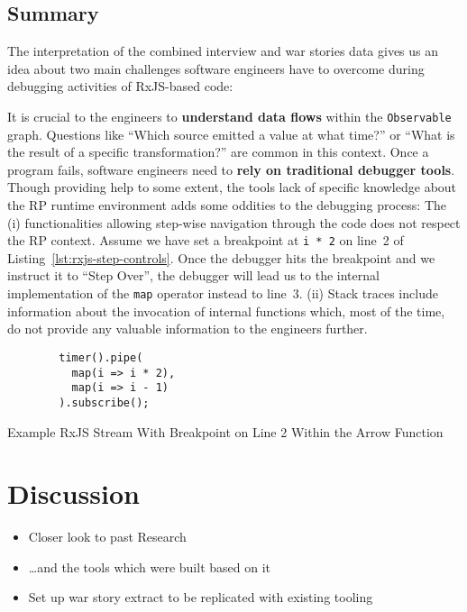 \documentclass[12pt,a4paper]{article}
\begin{document}
\subsection{Summary}

The interpretation of the combined interview and war stories data gives us an idea about two main challenges software engineers have to overcome during debugging activities of RxJS-based code:

It is crucial to the engineers to \textbf{understand data flows}  within the \texttt{Observable} graph. Questions like ``Which source emitted a value at what time?'' or ``What is the result of a specific transformation?'' are common in this context. Once a program fails, software engineers need to \textbf{rely on traditional debugger tools}. Though providing help to some extent, the tools lack of specific knowledge about the RP runtime environment adds some oddities to the debugging process: The (i) functionalities allowing step-wise navigation through the code does not respect the RP context. Assume we have set a breakpoint at \texttt{i * 2} on line~2 of Listing~\ref{lst:rxjs-step-controls}. Once the debugger hits the breakpoint and we instruct it to ``Step Over'', the debugger will lead us to the internal implementation of the \texttt{map} operator instead to line~3. (ii) Stack traces include information about the invocation of internal functions which, most of the time, do not provide any valuable information to the engineers further.

\begin{listing}[H]
	\begin{verbatim}
		timer().pipe(
		  map(i => i * 2),
		  map(i => i - 1)
		).subscribe();
	\end{verbatim}
	\caption{Example RxJS Stream With Breakpoint on Line 2 Within the Arrow Function}
	\label{lst:rxjs-step-controls}
\end{listing}


\section{Discussion}
\label{sec:discussion}

\begin{itemize}
	\item Closer look to past Research
	\item \dots and the tools which were built based on it
	\item Set up war story extract to be replicated with existing tooling
\end{itemize}
\end{document}
